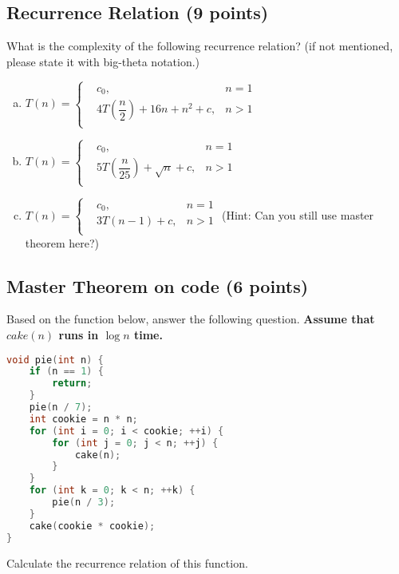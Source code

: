 \documentclass[11pt]{exam}
\begin{document}
\subsection{Recurrence Relation (9 points)}
What is the complexity of the following recurrence relation? (if not mentioned, please state it with big-theta notation.)
\begin{enumerate}[(a)]

\item $T(n) = \left\{
\begin{aligned}
&c_0, &n=1\\
&4T\left(\dfrac{n}{2}\right)+16n+n^2+c, &n>1\\
\end{aligned}
\right.
$

\begin{solution}
\end{solution}

\item $T(n) = \left\{
\begin{aligned}
&c_0, &n=1\\
&5T\left(\dfrac{n}{25}\right)+\sqrt{n}+c, &n>1\\
\end{aligned}
\right.
$

\begin{solution}
\end{solution}

\item $T(n) = \left\{
\begin{aligned}
&c_0, &n=1\\
&3T(n-1)+c, &n>1\\
\end{aligned}
\right.
$ (Hint: Can you still use master theorem here?)
\begin{solution}
\end{solution}
\end{enumerate}

\subsection{Master Theorem on code (6 points)}
Based on the function below, answer the following question. \textbf{Assume that $cake(n)$ runs in $\log n$ time.}
\begin{lstlisting}[language=c++]
void pie(int n) {
	if (n == 1) {
		return;
	}
	pie(n / 7);
	int cookie = n * n;
	for (int i = 0; i < cookie; ++i) {
		for (int j = 0; j < n; ++j) {
			cake(n);
		}
	}
	for (int k = 0; k < n; ++k) {
		pie(n / 3);
	}
	cake(cookie * cookie);
}
\end{lstlisting}
Calculate the recurrence relation of this function.
\begin{solution}
\end{solution}
\end{document}
